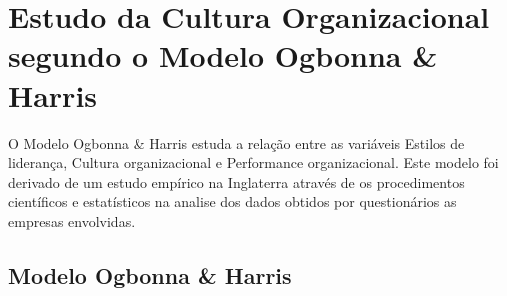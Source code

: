 {
\newpage
\section{Estudo da Cultura Organizacional segundo o Modelo Ogbonna \& Harris}
\qquad O Modelo Ogbonna \& Harris estuda a relação entre as variáveis Estilos de liderança, Cultura organizacional e Performance organizacional. Este modelo foi derivado de um estudo empírico na Inglaterra através de os procedimentos científicos e estatísticos na analise dos dados obtidos por questionários as empresas envolvidas.\\

\subsection{Modelo Ogbonna \& Harris}
\\
\\

}

